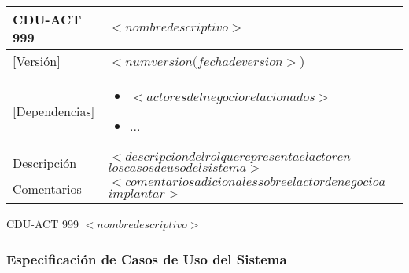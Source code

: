   \begin{Artefacto}[H]
    \centering
    \begin{tabular}{|p{3cm}|p{10cm}|}
        \hline
         \cellcolor{gray30}  CDU-ACT 999	&  $<nombre descriptivo>$\\ 
        \hline
         \cellcolor{gray30}  [Versión]	&  $<num version(fecha de version>$)\\   
         \hline
         \cellcolor{gray30}  [Dependencias] &  	\begin{itemize} \item $<actores del negocio relacionados>$\item	... \end{itemize}\\  

        \hline
         \cellcolor{gray30} Descripción	& $<descripcion del rol que representa el actor en$ $ los casos de uso del sistema >$ \\
        \hline
         \cellcolor{gray30}  Comentarios	&$<comentarios adicionales sobre el actor de negocio  a$ $ implantar>$\\   
        \hline
  
    \end{tabular}
\caption{CDU-ACT 999	$<nombre descriptivo>$ }
  \end{Artefacto}



\subsubsection{Especificación de Casos de Uso del Sistema}


 


